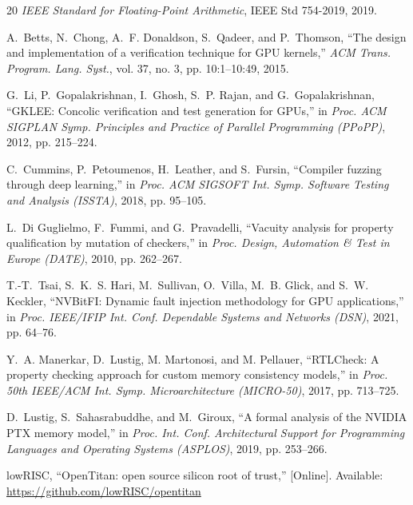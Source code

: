 \documentclass[conference]{IEEEtran}
\begin{document}
\begin{thebibliography}{20}
	\emph{IEEE Standard for Floating-Point Arithmetic}, IEEE Std
	754-2019, 2019.

	A.~Betts, N.~Chong, A.~F. Donaldson, S.~Qadeer, and P.~Thomson,
	``The design and implementation of a verification technique for GPU
	kernels,'' \emph{ACM Trans. Program. Lang. Syst.}, vol. 37, no. 3,
	pp. 10:1--10:49, 2015.

	G.~Li, P.~Gopalakrishnan, I.~Ghosh, S.~P. Rajan, and G.~Gopalakrishnan,
	``GKLEE: Concolic verification and test generation for GPUs,''
	in \emph{Proc. ACM SIGPLAN Symp. Principles and Practice of Parallel
		Programming (PPoPP)}, 2012, pp. 215--224.

	C.~Cummins, P.~Petoumenos, H.~Leather, and S.~Fursin,
	``Compiler fuzzing through deep learning,'' in \emph{Proc. ACM
		SIGSOFT Int. Symp. Software Testing and Analysis (ISSTA)}, 2018,
	pp. 95--105.

	L.~Di Guglielmo, F.~Fummi, and G.~Pravadelli,
	``Vacuity analysis for property qualification by mutation of
	checkers,'' in \emph{Proc. Design, Automation \& Test in Europe
		(DATE)}, 2010, pp. 262--267.

	T.-T.~Tsai, S.~K.~S. Hari, M.~Sullivan, O.~Villa, M.~B. Glick, and
	S.~W. Keckler, ``NVBitFI: Dynamic fault injection methodology for GPU
	applications,'' in \emph{Proc. IEEE/IFIP Int. Conf. Dependable Systems
		and Networks (DSN)}, 2021, pp. 64--76.

	Y.~A. Manerkar, D.~Lustig, M. Martonosi, and M. Pellauer,
	``RTLCheck: A property checking approach for custom memory consistency
	models,'' in \emph{Proc. 50th IEEE/ACM Int. Symp. Microarchitecture
		(MICRO-50)}, 2017, pp. 713--725.

	D.~Lustig, S.~Sahasrabuddhe, and M.~Giroux,
	``A formal analysis of the NVIDIA PTX memory model,'' in \emph{Proc.
		Int. Conf. Architectural Support for Programming Languages and
		Operating Systems (ASPLOS)}, 2019, pp. 253--266.

	lowRISC, ``OpenTitan: open source silicon root of trust,'' [Online].
	Available: \url{https://github.com/lowRISC/opentitan}

\end{thebibliography}
\end{document}
